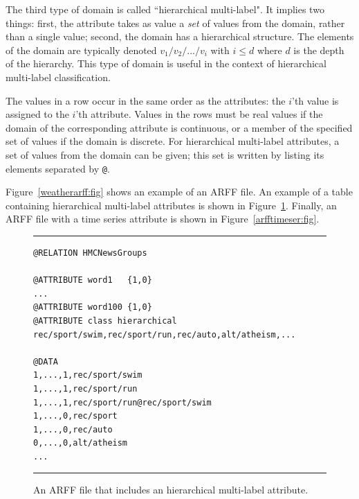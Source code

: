 \documentclass[a4paper]{report}
\begin{document}
The third type of domain is called ``hierarchical multi-label".  It implies two things: first, the attribute takes as value a {\em set} of values from the domain, rather than a single value; second, the domain has a hierarchical structure.  The elements of the domain are typically denoted $v_1/v_2/.../v_i$ with $i \leq d$ where $d$ is the depth of the hierarchy.  This type of domain is useful in the context of hierarchical multi-label classification.  

The values in a	 row occur in the same order as the attributes: the $i$'th value is assigned to the $i$'th attribute.  Values in the rows must be real values if the domain of the corresponding attribute is continuous, or a member of the specified set of values if the domain is discrete.  For hierarchical multi-label attributes, a set of values from the domain can be given; this set is written by listing its elements separated by \verb^@^.

Figure~\ref{weatherarff:fig} shows an example of an ARFF file. An example of a table containing hierarchical multi-label attributes is shown in Figure~\ref{arffhmc:fig}. Finally, an ARFF file with a time series attribute is shown in Figure~\ref{arfftimeser:fig}.

\begin{figure}[tb]
\hrule\vspace{1em}
\begin{verbatim}
@RELATION HMCNewsGroups

@ATTRIBUTE word1   {1,0}
...
@ATTRIBUTE word100 {1,0}
@ATTRIBUTE class hierarchical rec/sport/swim,rec/sport/run,rec/auto,alt/atheism,...

@DATA
1,...,1,rec/sport/swim
1,...,1,rec/sport/run
1,...,1,rec/sport/run@rec/sport/swim
1,...,0,rec/sport
1,...,0,rec/auto
0,...,0,alt/atheism
...
\end{verbatim}
\hrule\vspace{1em}
\caption{An ARFF file that includes an hierarchical multi-label attribute.}
\label{arffhmc:fig}
\end{figure}
\end{document}
